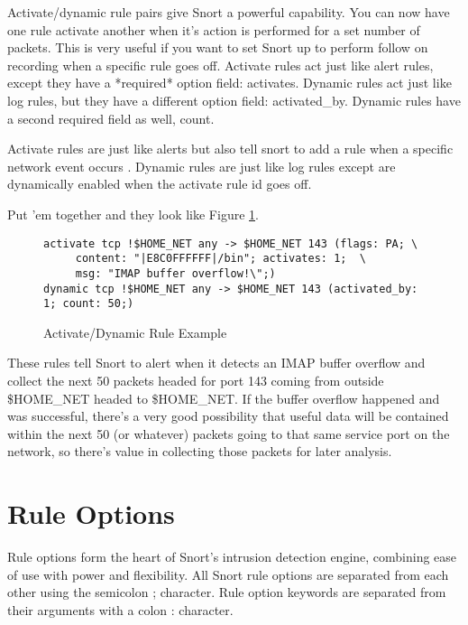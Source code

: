 \documentclass[english]{report}
\begin{document}
Activate/dynamic rule pairs give Snort a powerful capability. You
can now have one rule activate another when it's action is performed
for a set number of packets. This is very useful if you want to set
Snort up to perform follow on recording when a specific rule goes
off. Activate rules act just like alert rules, except they
have a {*}required{*} option field: activates.
Dynamic rules act just like log rules, but they have a different option
field: activated\_by. Dynamic rules have a second
required field as well, count. 

Activate rules are just like alerts but also tell snort to add a rule
when a specific network event occurs . Dynamic rules are just like
log rules except are dynamically enabled when the activate rule id
goes off. 

Put 'em together and they look like Figure \ref{activate/dynamic rule example}.

%
\begin{figure}[!hbpt]
\begin{verbatim}
activate tcp !$HOME_NET any -> $HOME_NET 143 (flags: PA; \
     content: "|E8C0FFFFFF|/bin"; activates: 1;  \
     msg: "IMAP buffer overflow!\";)
dynamic tcp !$HOME_NET any -> $HOME_NET 143 (activated_by: 1; count: 50;)
\end{verbatim}

\caption{Activate/Dynamic Rule Example\label{activate/dynamic rule example}}
\end{figure}


These rules tell Snort to alert when it detects an IMAP buffer overflow
and collect the next 50 packets headed for port 143 coming from outside
\$HOME\_NET headed to \$HOME\_NET. If the buffer overflow happened
and was successful, there's a very good possibility that useful data
will be contained within the next 50 (or whatever) packets going to
that same service port on the network, so there's value in collecting
those packets for later analysis.


\section{Rule Options}

Rule options form the heart of Snort's intrusion detection engine,
combining ease of use with power and flexibility. All Snort rule options
are separated from each other using the semicolon ;
character. Rule option keywords are separated from their arguments
with a colon : character. 
\end{document}

